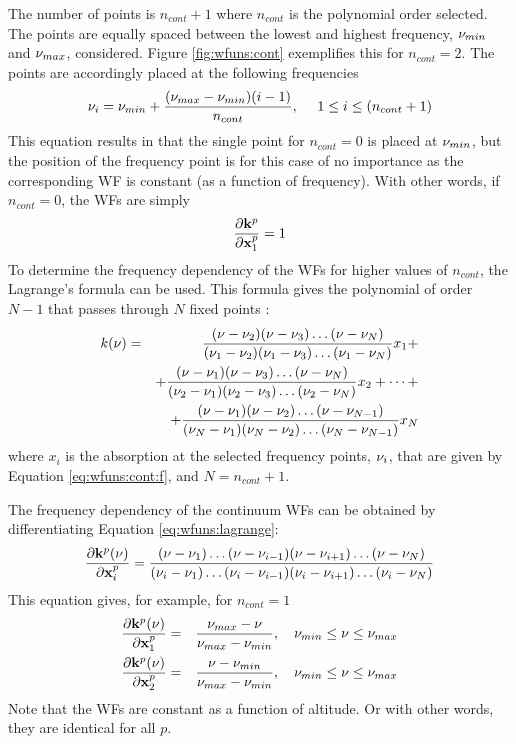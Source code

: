  
 The number of points is $n_{cont}+1$ where $n_{cont}$ is the
 polynomial order selected.  The points are equally spaced between the
 lowest and highest frequency, $\nu_{min}$ and $\nu_{max}$, considered.
 Figure \ref{fig:wfuns:cont} exemplifies this for $n_{cont}=2$.  The
 points are accordingly placed at the following frequencies
 \begin{equation}
   \nu_i = \nu_{min} + \frac{(\nu_{max}-\nu_{min})(i-1)}{n_{cont}}, \
          \quad 1 \leq i \leq (n_{cont}+1)
  \label{eq:wfuns:cont:f}
 \end{equation}
 This equation results in that the single point for $n_{cont}=0$ is
 placed at $\nu_{min}$, but the position of the frequency point is
 for this case of no importance as the corresponding WF is constant
 (as a function of frequency). With other words, 
 if $n_{cont}=0$, the WFs are simply 
 \begin{equation}
   \frac{\partial \mathbf{k}^p}{\partial \mathbf{x}^p_1} = 1
 \end{equation}
 To determine the frequency dependency of the WFs for higher values of
 $n_{cont}$, the Lagrange's formula can be used. This formula gives
 the polynomial of order $N-1$ that passes through $N$ fixed points
 \citep[][Eq. 3.1.1]{press:92}:
 \begin{eqnarray}
   k(\nu) &=& \frac{(\nu-\nu_2)(\nu-\nu_3)\dots(\nu-\nu_N)}
                  {(\nu_1-\nu_2)(\nu_1-\nu_3)\dots(\nu_1-\nu_N)}
           x_1 + \nonumber \\ 
       & & +\frac{(\nu-\nu_1)(\nu-\nu_3)\dots(\nu-\nu_N)}
                 {(\nu_2-\nu_1)(\nu_2-\nu_3)\dots(\nu_2-\nu_N)}
           x_2 + \cdots + \nonumber \\
       & & +\frac{(\nu-\nu_1)(\nu-\nu_2)\dots(\nu-\nu_{N-1})}
                 {(\nu_N-\nu_1)(\nu_N-\nu_2)\dots(\nu_N-\nu_{N-1})} x_N
  \label{eq:wfuns:lagrange}
 \end{eqnarray}
 where $x_i$ is the absorption at the selected frequency points, $\nu_i$,
 that are given by Equation \ref{eq:wfuns:cont:f}, and $N=n_{cont}+1$.
 
 The frequency dependency of the continuum WFs can be obtained by
 differentiating Equation \ref{eq:wfuns:lagrange}:
 \begin{equation}
   \frac{\partial \mathbf{k}^p(\nu)}{\partial \mathbf{x}^p_i} =
   \frac{(\nu-\nu_1)\dots(\nu-\nu_{i-1})(\nu-\nu_{i+1})\dots(\nu-\nu_N)}{(\nu_i-\nu_1)\dots(\nu_i-\nu_{i-1})(\nu_i-\nu_{i+1})\dots(\nu_i-\nu_N)}
 \end{equation}
 This equation gives, for example, for $n_{cont}=1$
 \begin{eqnarray}
   \frac{\partial \mathbf{k}^p(\nu)}{\partial \mathbf{x}^p_1} &=& \frac{\nu_{max}-\nu}
          {\nu_{max}-\nu_{min}}, \quad \nu_{min}\leq \nu \leq \nu_{max} \\
   \frac{\partial \mathbf{k}^p(\nu)}{\partial \mathbf{x}^p_2} &=& \frac{\nu-\nu_{min}}
          {\nu_{max}-\nu_{min}}, \quad \nu_{min}\leq \nu \leq \nu_{max}
 \end{eqnarray}
 Note that the WFs are constant as a function of altitude. Or with
 other words, they are identical for all $p$.


